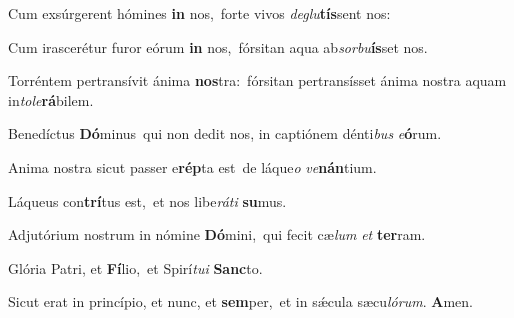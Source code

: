 Cum exsúrgerent hómines \textbf{in} nos,~\redgreheightstar forte vivos \textit{de}\textit{glu}\textbf{tís}sent nos:

Cum irascerétur furor eórum \textbf{in} nos,~\redgreheightstar fórsitan aqua ab\textit{sor}\textit{bu}\textbf{ís}set nos.

Torréntem pertransívit ánima \textbf{nos}tra:~\redgreheightstar fórsitan pertransísset ánima nostra aquam in\textit{to}\textit{le}\textbf{rá}bilem.

Benedíctus \textbf{Dó}minus~\redgreheightstar qui non dedit nos, in captiónem dénti\textit{bus} \textit{e}\textbf{ó}rum.

Anima nostra sicut passer e\textbf{rép}ta est~\redgreheightstar de láque\textit{o} \textit{ve}\textbf{nán}tium.

Láqueus con\textbf{trí}tus est,~\redgreheightstar et nos libe\textit{rá}\textit{ti} \textbf{su}mus.

Adjutórium nostrum in nómine \textbf{Dó}mini,~\redgreheightstar qui fecit cæ\textit{lum} \textit{et} \textbf{ter}ram.

Glória Patri, et \textbf{Fí}lio,~\redgreheightstar et Spirí\textit{tu}\textit{i} \textbf{Sanc}to.

Sicut erat in princípio, et nunc, et \textbf{sem}per,~\redgreheightstar et in sǽcula sæcu\textit{ló}\textit{rum}. \textbf{A}men.

